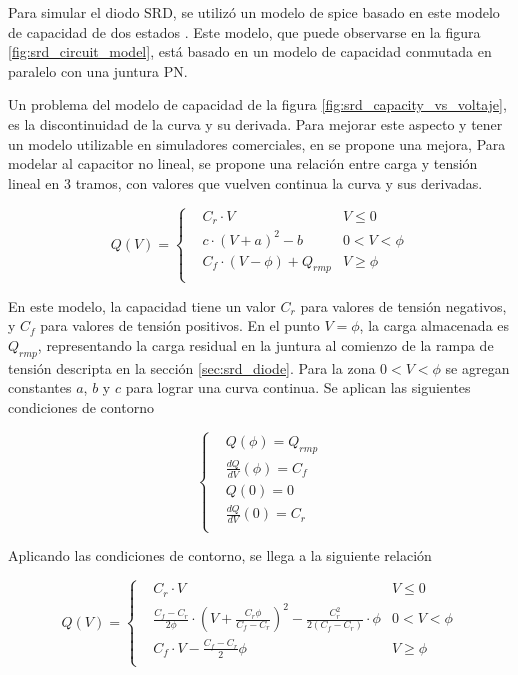 Para simular el diodo SRD, se utilizó un modelo de spice basado en este modelo
de capacidad de dos estados \cite{zhang1995} \cite{zhang1996}. Este modelo, que
puede observarse en la figura \ref{fig:srd_circuit_model}, está basado en un
modelo de capacidad conmutada en paralelo con una juntura PN.

Un problema del modelo de capacidad de la figura
\ref{fig:srd_capacity_vs_voltaje}, es la discontinuidad de la curva y su
derivada. Para mejorar este aspecto y tener un modelo utilizable en simuladores
comerciales, en \cite{zhang1995} se propone una mejora, Para modelar al
capacitor no lineal, se propone una relación entre carga y tensión lineal en 3
tramos, con valores que vuelven continua la curva y sus derivadas.

\begin{equation}
Q(V) =
    \left\{
    \begin{aligned}
        & C_r \cdot V  & V \leq 0 \\
        & c \cdot \left(V+a \right)^2 -b  & 0 < V < \phi \\
        & C_f \cdot \left( V - \phi \right) + Q_{rmp} & V \geq \phi \\
    \end{aligned}
    \right.
\end{equation}

En este modelo, la capacidad tiene un valor $C_r$ para valores de tensión
negativos, y $C_f$ para valores de tensión positivos. En el punto $V=\phi$, la
carga almacenada es $Q_{rmp}$, representando la carga residual en la juntura al
comienzo de la rampa de tensión descripta en la sección \ref{sec:srd_diode}.
Para la zona $0 < V < \phi$ se agregan constantes $a$, $b$ y $c$ para lograr una
curva continua. Se aplican las siguientes condiciones de contorno

\begin{equation}
    \left\{
    \begin{aligned}
        & Q(\phi) = Q_{rmp} \\
        & \frac{dQ}{dV}(\phi) = C_f \\
        & Q(0) = 0 \\
        & \frac{dQ}{dV}(0) = C_r \\
    \end{aligned}
    \right.
\end{equation}

Aplicando las condiciones de contorno, se llega a la siguiente relación

\begin{equation}
\label{eq:srd_non_linear_cap}
Q(V) =
    \left\{
    \begin{aligned}
        & C_r \cdot V  & V \leq 0 \\
        & \frac{C_f-C_r}{2\phi} \cdot \left(V+\frac{C_r\phi}{C_f-C_r} \right)^2
        -\frac{C_r^2}{2\left(C_f-C_r \right)}\cdot \phi  & 0 < V < \phi \\
        & C_f \cdot V - \frac{C_f-C_r}{2} \phi & V \geq \phi \\
    \end{aligned}
    \right.
\end{equation}

